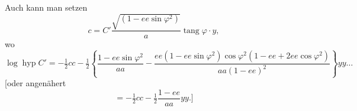 \documentclass[12pt,a4paper]{article}
\theoremstyle{plain}
\theoremstyle{definition}
\theoremstyle{remark}
\newcommand{\tang}{\operatorname{tang}}
\newcommand{\ee}{\mathit{ee}}
\begin{document}
Auch kann man setzen
\[
c = C'\frac{\sqrt{(1 - \ee\sin\varphi^2)}}{a}\tang\varphi\cdot y,
\]
wo
\[
\log\operatorname{hyp} C' = -\tfrac{1}{2}cc - \tfrac{1}{2}\left\{\frac{1 - \ee\sin\varphi^2}{aa} - \frac{\ee(1 - \ee\sin\varphi^2)\cos\varphi^2(1 - \ee + 2\ee\cos\varphi^2)}{aa(1 - \ee)^2}\right\}yy \ldots
\]
[oder angenähert
\[
= -\tfrac{1}{2}cc - \tfrac{1}{2}\frac{1 - \ee}{aa}yy.]
\]
\end{document}

